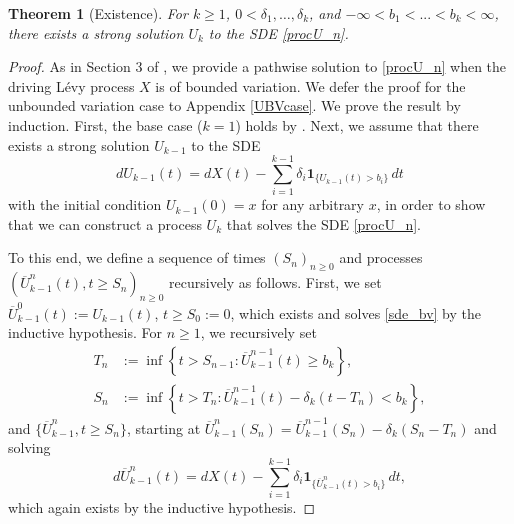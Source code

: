 \documentclass[12pt,reqno]{amsart}
\newtheorem{theorem}{Theorem}
\theoremstyle{definition}
\theoremstyle{remark}
\newcommand{\ind}{\mathbf{1}}
\begin{document}
\begin{theorem}[Existence]\label{lem:mr.exist}
For $k \geq 1$, $0<\delta_1,\dots,\delta_k$, and $-\infty<b_1<...<b_k < \infty$, there exists a strong 
solution $U_k$ to the SDE \eqref{procU_n}. 
		\end{theorem}

	\begin{proof} 
	
	
		

		 As in Section 3 of \cite{kyprianouloeffen2010}, we provide a pathwise solution 
		to \eqref{procU_n} when the driving L\'evy process $X$ is of bounded variation. We defer the proof for the unbounded variation case to Appendix \ref{UBVcase}. 
		We prove the result by induction. First, the base case ($k=1$) holds by \cite{kyprianouloeffen2010}. 
		Next, we assume that there exists a strong solution $U_{k-1}$ to the SDE
		\begin{equation}\label{sde_bv}
			dU_{k-1}(t)=dX(t)-\sum_{i=1}^{k-1}\delta_i \ind_{\{U_{k-1}(t)>b_i\}}\,dt
		\end{equation}
		with the initial condition $U_{k-1}(0)=x$ for any arbitrary $x$, in order to show that we can construct a process $U_ k$ that solves the SDE \eqref{procU_n}. 
		
		
		
		 To this end, we define a sequence of times $(S_n)_{n \geq 0}$ and processes $(\overline{U}_{k-1}^n(t), t \geq S_n)_{n \geq 0}$
		 recursively as follows.  First, we set $\overline{U}_{k-1}^0(t) := U_{k-1}(t)$, $t \geq S_0 := 0$, 
		which exists and solves \eqref{sde_bv} by the inductive hypothesis. For $n \geq 1$, we recursively set 
				\begin{align*}
			T_n& :=\inf\left\{t>S_{n-1}: \overline{U}_{k-1}^{n-1}(t) \geq b_k \right\},\\
			S_n& :=\inf\left\{t>T_{n}:\overline{U}_{k-1}^{n-1}(t)-\delta_k(t-T_n) < b_k\right\},
		\end{align*}
		and  $\{ \overline{U}_{k-1}^n, t \geq S_n\}$, starting at $\overline{U}_{k-1}^{n}(S_n)=\overline{U}_{k-1}^{n-1}(S_n)-\delta_k(S_n-T_n)$ and solving
		\begin{equation}\label{U_1_k_1_k}
		d\overline{U}_{k-1}^n(t) = dX(t)-\sum_{i=1}^{k-1}\delta_i \ind_{\{\overline{U}_{k-1}^n(t)>b_i\}}\,dt,  %
		\end{equation}
		which again exists by the inductive hypothesis. %
		

\end{proof}
\end{document}
